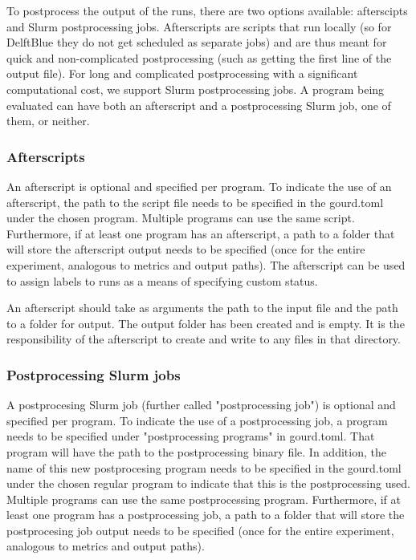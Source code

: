 To postprocess the output of the runs, there are two options available: afterscipts and Slurm postprocessing jobs. 
Afterscripts are scripts that run locally (so for DelftBlue they do not get scheduled as separate jobs) and are 
thus meant for quick and non-complicated postprocessing (such as getting the first line of the output file). For 
long and complicated postprocessing with a significant computational cost, we support Slurm postprocessing jobs.
A program being evaluated can have both an afterscript and a postprocessing Slurm job, one of them, or neither.

\subsubsection{Afterscripts}
An afterscript is optional and specified per program. To indicate the use of an afterscript, the path to the script 
file needs to be specified in the gourd.toml under the chosen program. Multiple programs can use the same script.
Furthermore, if at least one program has an afterscript, a path to a folder that will store the afterscript output 
needs to be specified (once for the entire experiment, analogous to metrics and output paths). The afterscript can 
be used to assign labels to runs as a means of specifying custom status.

An afterscript should take as arguments the path to the input file and the path to a folder for output. The output 
folder has been created and is empty. It is the responsibility of the afterscript to create and write to any files 
in that directory.

\subsubsection{Postprocessing Slurm jobs}
A postprocesing Slurm job (further called "postprocessing job") is optional and specified per program. To indicate 
the use of a postprocessing job, a program needs to be specified under "postprocessing programs" in gourd.toml. 
That program will have the path to the postprocessing binary file. In addition, the name of this new postprocesing 
program needs to be specified in the gourd.toml under the chosen regular program to indicate that this is the 
postprocessing used. Multiple programs can use the same postprocessing program. Furthermore, if at least one program 
has a postprocessing job, a path to a folder that will store the postprocesing job output needs to be specified 
(once for the entire experiment, analogous to metrics and output paths). 

